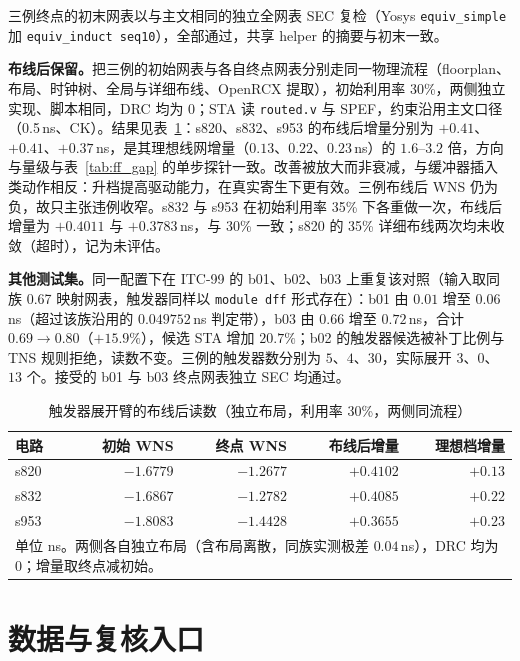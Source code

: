 \documentclass[twocolumn,10pt,fontset=windows]{ctexart}
\begin{document}
三例终点的初末网表以与主文相同的独立全网表 SEC 复检（Yosys \texttt{equiv\_simple} 加 \texttt{equiv\_induct seq10}），全部通过，共享 helper 的摘要与初末一致。

\textbf{布线后保留。}把三例的初始网表与各自终点网表分别走同一物理流程（floorplan、布局、时钟树、全局与详细布线、OpenRCX 提取），初始利用率 30\%，两侧独立实现、脚本相同，DRC 均为 0；STA 读 \texttt{routed.v} 与 SPEF，约束沿用主文口径（0.5\,ns、CK）。结果见表~\ref{tab:ff_phys}：s820、s832、s953 的布线后增量分别为 $+0.41$、$+0.41$、$+0.37$\,ns，是其理想线网增量（$0.13$、$0.22$、$0.23$\,ns）的 $1.6$--$3.2$ 倍，方向与量级与表~\ref{tab:ff_gap} 的单步探针一致。改善被放大而非衰减，与缓冲器插入类动作相反：升档提高驱动能力，在真实寄生下更有效。三例布线后 WNS 仍为负，故只主张违例收窄。s832 与 s953 在初始利用率 35\% 下各重做一次，布线后增量为 $+0.4011$ 与 $+0.3783$\,ns，与 30\% 一致；s820 的 35\% 详细布线两次均未收敛（超时），记为未评估。

\textbf{其他测试集。}同一配置下在 ITC-99 的 b01、b02、b03 上重复该对照（输入取同族 0.67 映射网表，触发器同样以 \texttt{module dff} 形式存在）：b01 由 $0.01$ 增至 $0.06$\,ns（超过该族沿用的 $0.049752$\,ns 判定带），b03 由 $0.66$ 增至 $0.72$\,ns，合计 $0.69\to0.80$（$+15.9\%$），候选 STA 增加 $20.7\%$；b02 的触发器候选被补丁比例与 TNS 规则拒绝，读数不变。三例的触发器数分别为 $5$、$4$、$30$，实际展开 $3$、$0$、$13$ 个。接受的 b01 与 b03 终点网表独立 SEC 均通过。

\begin{table}[H]
\centering
\caption{触发器展开臂的布线后读数（独立布局，利用率 30\%，两侧同流程）}
\label{tab:ff_phys}
\footnotesize
\setlength{\tabcolsep}{5pt}
\begin{tabular}{lrrrr}
\toprule
\textbf{电路} & \textbf{初始 WNS} & \textbf{终点 WNS} & \textbf{布线后增量} & \textbf{理想档增量} \\
\midrule
s820 & $-1.6779$ & $-1.2677$ & $+0.4102$ & $+0.13$ \\
s832 & $-1.6867$ & $-1.2782$ & $+0.4085$ & $+0.22$ \\
s953 & $-1.8083$ & $-1.4428$ & $+0.3655$ & $+0.23$ \\
\bottomrule
\multicolumn{5}{p{0.94\columnwidth}}{\footnotesize 单位 ns。两侧各自独立布局（含布局离散，同族实测极差 $0.04$\,ns），DRC 均为 0；增量取终点减初始。}\\
\end{tabular}
\end{table}

\section{数据与复核入口}
\end{document}

